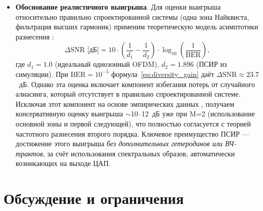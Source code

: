 \documentclass[a4paper,12pt]{article}
\numberwithin{equation}{section}
\begin{document}
\begin{itemize}
    \item \textbf{Обоснование реалистичного выигрыша}. 
    Для оценки выигрыша относительно правильно спроектированной 
    системы (одна зона Найквиста, фильтрация высших гармоник) применим 
    теоретическую модель асимптотики разнесения \cite{proakis}:
    \begin{equation}
        \Delta\text{SNR [дБ]} = 10 \cdot \left(\frac{1}{d_1} - \frac{1}{d_2}\right) \cdot \log_{10}\left(\frac{1}{\text{BER}}\right),
        \label{eq:diversity_gain}
    \end{equation}
    где $d_1 = 1.0$ (идеальный однозонный OFDM), $d_2 = 1.896$ (ПСИР из симуляции). 
    При $\text{BER} = 10^{-5}$ формула~\eqref{eq:diversity_gain} даёт 
    $\Delta\text{SNR} \approx 23.7$~дБ. Однако эта оценка включает компонент 
    избегания потерь от случайного алиасинга, который отсутствует в правильно 
    спроектированной системе. Исключая этот компонент на основе эмпирических 
    данных \cite{proakis,goldsmith}, получаем консервативную оценку выигрыша 
    $\sim$10--12~дБ уже при M=2 (использование основной зоны и первой следующей), что полностью согласуется с теорией частотного разнесения 
    второго порядка. Ключевое преимущество ПСИР --- достижение этого выигрыша 
    \textit{без дополнительных гетеродинов или ВЧ-трактов}, за счёт использования 
    спектральных образов, автоматически возникающих на выходе ЦАП.

\end{itemize}

\section{Обсуждение и ограничения}
\label{sec:discussion}
\end{document}
